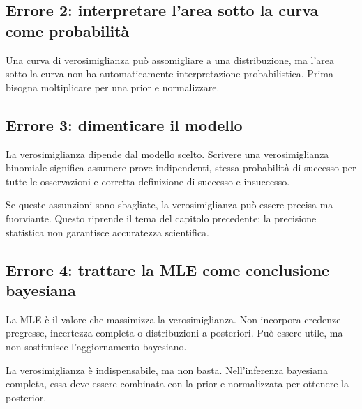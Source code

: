 \documentclass[
  italian,
  letterpaper,
  a4paper,
  11pt,
  open=any]{scrbook}
\theoremstyle{plain}
\theoremstyle{definition}
\theoremstyle{definition}
\theoremstyle{remark}
\begin{document}
\subsection{Errore 2: interpretare l'area sotto la curva come
probabilità}\label{errore-2-interpretare-larea-sotto-la-curva-come-probabilituxe0}

Una curva di verosimiglianza può assomigliare a una distribuzione, ma
l'area sotto la curva non ha automaticamente interpretazione
probabilistica. Prima bisogna moltiplicare per una prior e normalizzare.

\subsection{Errore 3: dimenticare il
modello}\label{errore-3-dimenticare-il-modello}

La verosimiglianza dipende dal modello scelto. Scrivere una
verosimiglianza binomiale significa assumere prove indipendenti, stessa
probabilità di successo per tutte le osservazioni e corretta definizione
di successo e insuccesso.

Se queste assunzioni sono sbagliate, la verosimiglianza può essere
precisa ma fuorviante. Questo riprende il tema del capitolo precedente:
la precisione statistica non garantisce accuratezza scientifica.

\subsection{Errore 4: trattare la MLE come conclusione
bayesiana}\label{errore-4-trattare-la-mle-come-conclusione-bayesiana}

La MLE è il valore che massimizza la verosimiglianza. Non incorpora
credenze pregresse, incertezza completa o distribuzioni a posteriori.
Può essere utile, ma non sostituisce l'aggiornamento bayesiano.

\begin{tcolorbox}[enhanced jigsaw, arc=.35mm, bottomrule=.15mm, bottomtitle=1mm, breakable, colback=white, colbacktitle=quarto-callout-warning-color!10!white, colframe=quarto-callout-warning-color-frame, coltitle=black, left=2mm, leftrule=.75mm, opacityback=0, opacitybacktitle=0.6, rightrule=.15mm, title=\textcolor{quarto-callout-warning-color}{\faExclamationTriangle}\hspace{0.5em}{Sintesi}, titlerule=0mm, toprule=.15mm, toptitle=1mm]

La verosimiglianza è indispensabile, ma non basta. Nell'inferenza
bayesiana completa, essa deve essere combinata con la prior e
normalizzata per ottenere la posterior.

\end{tcolorbox}
\end{document}
